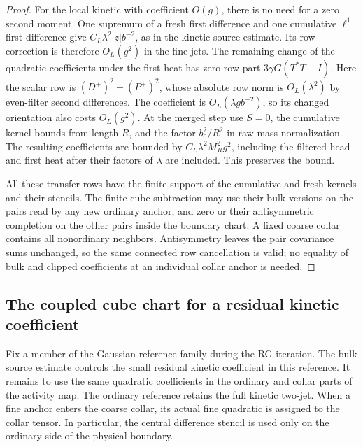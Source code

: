 \documentclass[11pt]{article}
\theoremstyle{definition}
\begin{document}
\begin{proof}
For the local kinetic with coefficient \(O(g)\), there is no
need for a zero second moment. One supremum of a fresh
first difference and one cumulative \(\ell^1\) first
difference give \(C_L\lambda^2 |z| b^{-2}\), as in the
kinetic source estimate. Its row correction is therefore
\(O_L(g^2)\) in the fine jets. The remaining change of the
quadratic coefficients under the first heat has zero-row
part \(3\gamma G(T^*T-I)\). Here the scalar row is
\((D^+)^2-(P^+)^2\), whose absolute row norm is
\(O_L(\lambda^2)\) by even-filter second differences.
The coefficient is \(O_L(\lambda g b^{-2})\), so its
changed orientation also costs \(O_L(g^2)\).
At the merged step use \(S=0\), the cumulative kernel
bounds from length \(R\), and the factor \(b_0^2/R^2\)
in raw mass normalization. The resulting coefficients are
bounded by \(C_L\lambda^2 M_R^2 g^2\), including the
filtered head and first heat after their factors of
\(\lambda\) are included. This preserves the bound.

All these transfer rows have the finite support of the
cumulative and fresh kernels and their stencils. The finite
cube subtraction may use their bulk versions on the pairs
read by any new ordinary anchor, and zero or their
antisymmetric completion on the other pairs inside the
boundary chart. A fixed coarse collar contains all
nonordinary neighbors. Antisymmetry leaves the pair
covariance sums unchanged, so the same connected row
cancellation is valid; no equality of bulk and clipped
coefficients at an individual collar anchor is needed.
\end{proof}

\subsection{The coupled cube chart for a residual kinetic coefficient}
\label{sec:residual-coupled-chart}

Fix a member of the Gaussian reference family during the RG
iteration. The bulk source estimate controls the small residual
kinetic coefficient in this reference. It remains to use the
same quadratic coefficients in the ordinary and collar parts of
the activity map. The ordinary reference retains the full kinetic
two-jet. When a fine anchor enters the coarse collar, its actual
fine quadratic is assigned to the collar tensor. In particular,
the central difference stencil is used only on the ordinary side
of the physical boundary.
\end{document}
